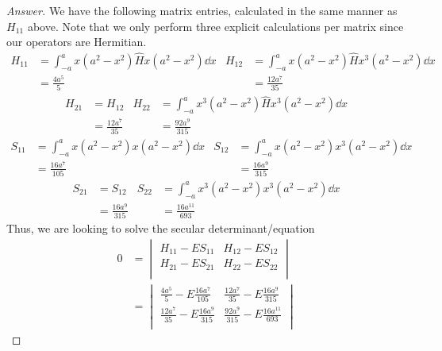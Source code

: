 \documentclass[../psets.tex]{subfiles}
\begin{document}
\begin{enumerate}
\begin{enumerate}
\begin{proof}[Answer]
            We have the following matrix entries, calculated in the same manner as $H_{11}$ above. Note that we only perform three explicit calculations per matrix since our operators are Hermitian.
            \begin{align*}
                H_{11} &= \int_{-a}^ax(a^2-x^2)\hat{H}x(a^2-x^2)\dd{x}&
                    H_{12} &= \int_{-a}^ax(a^2-x^2)\hat{H}x^3(a^2-x^2)\dd{x}\\
                &= \frac{4a^5}{5}&
                    &= \frac{12a^7}{35}
            \end{align*}
            \begin{align*}
                H_{21} &= H_{12}&
                    H_{22} &= \int_{-a}^ax^3(a^2-x^2)\hat{H}x^3(a^2-x^2)\dd{x}\\
                &= \frac{12a^7}{35}&
                    &= \frac{92a^9}{315}
            \end{align*}
            \begin{align*}
                S_{11} &= \int_{-a}^ax(a^2-x^2)x(a^2-x^2)\dd{x}&
                    S_{12} &= \int_{-a}^ax(a^2-x^2)x^3(a^2-x^2)\dd{x}\\
                &= \frac{16a^7}{105}&
                    &= \frac{16a^9}{315}
            \end{align*}
            \begin{align*}
                S_{21} &= S_{12}&
                    S_{22} &= \int_{-a}^ax^3(a^2-x^2)x^3(a^2-x^2)\dd{x}\\
                &= \frac{16a^9}{315}&
                    &= \frac{16a^{11}}{693}
            \end{align*}
            Thus, we are looking to solve the secular determinant/equation
            \begin{align*}
                0 &=
                \begin{vmatrix}
                    H_{11}-ES_{11} & H_{12}-ES_{12}\\
                    H_{21}-ES_{21} & H_{22}-ES_{22}\\
                \end{vmatrix}\\
                &=
                \begin{vmatrix}
                    \frac{4a^5}{5}-E\frac{16a^7}{105} & \frac{12a^7}{35}-E\frac{16a^9}{315}\\
                    \frac{12a^7}{35}-E\frac{16a^9}{315} & \frac{92a^9}{315}-E\frac{16a^{11}}{693}\\

\end{vmatrix}
\end{align*}
\end{proof}
\end{enumerate}
\end{enumerate}
\end{document}
